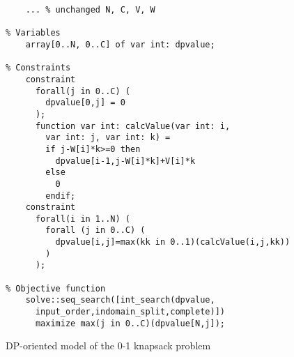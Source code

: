 	\begin{figure}[htb]
\begin{lstlisting}[frame=single]
% Input arguments
    ... % unchanged N, C, V, W

% Variables
    array[0..N, 0..C] of var int: dpvalue;

% Constraints
    constraint
      forall(j in 0..C) (
        dpvalue[0,j] = 0
      );
      function var int: calcValue(var int: i, 
        var int: j, var int: k) =
        if j-W[i]*k>=0 then
          dpvalue[i-1,j-W[i]*k]+V[i]*k
        else
          0
        endif;
    constraint
      forall(i in 1..N) (
        forall (j in 0..C) (
          dpvalue[i,j]=max(kk in 0..1)(calcValue(i,j,kk))
        )
      );

% Objective function    
    solve::seq_search([int_search(dpvalue,
      input_order,indomain_split,complete)]) 
      maximize max(j in 0..C)(dpvalue[N,j]);
\end{lstlisting}
\caption{DP-oriented model of the 0-1 knapsack problem}\label{fig:knapsack2}
\end{figure}

